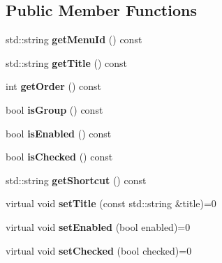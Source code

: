 \subsection*{Public Member Functions}
\begin{DoxyCompactItemize}
\item 
\mbox{\label{classPlayerMenuItem_a141817b9b1e8391cffccd6ae5fa9c483}} 
std\+::string {\bfseries get\+Menu\+Id} () const
\item 
\mbox{\label{classPlayerMenuItem_a0c7fab72ed8298958b62c47c3e0608a5}} 
std\+::string {\bfseries get\+Title} () const
\item 
\mbox{\label{classPlayerMenuItem_a19c976698711e1ad7b6063852f3c00c9}} 
int {\bfseries get\+Order} () const
\item 
\mbox{\label{classPlayerMenuItem_a06a19e2051bcc39a52876377af4eb99a}} 
bool {\bfseries is\+Group} () const
\item 
\mbox{\label{classPlayerMenuItem_a05725bc23b5b8f881ec79eedaaca8328}} 
bool {\bfseries is\+Enabled} () const
\item 
\mbox{\label{classPlayerMenuItem_ad6e8d2ebd0edac2feefbe704fac776ba}} 
bool {\bfseries is\+Checked} () const
\item 
\mbox{\label{classPlayerMenuItem_a66487fa15cad99a96911cba5078ec052}} 
std\+::string {\bfseries get\+Shortcut} () const
\item 
\mbox{\label{classPlayerMenuItem_ab6ea2d1abec88751d164f746712a49ed}} 
virtual void {\bfseries set\+Title} (const std\+::string \&title)=0
\item 
\mbox{\label{classPlayerMenuItem_a989104eb681f77541fb7136a8ad12368}} 
virtual void {\bfseries set\+Enabled} (bool enabled)=0
\item 
\mbox{\label{classPlayerMenuItem_a75e9dde4aa28cdec7fe2524246ec7ec5}} 
virtual void {\bfseries set\+Checked} (bool checked)=0
\item 

\end{DoxyCompactItemize}
